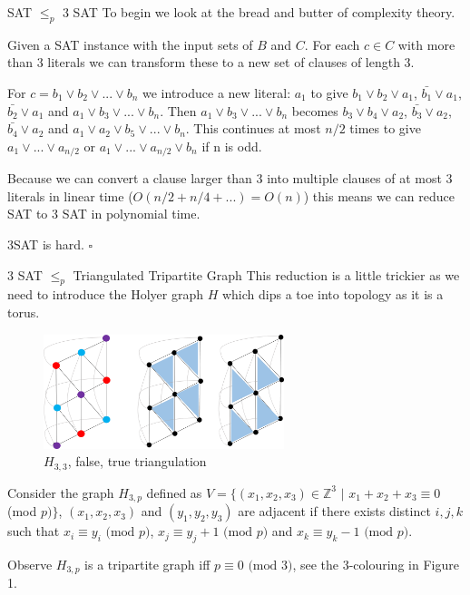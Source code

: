 \documentclass[final]{beamer}
\newlength{\colwidth}
\newcounter{col}
\begin{document}
\begin{frame}[t]
\begin{columns}[t]
\begin{column}{\colwidth}
\begin{block}{SAT $\leq_p$ 3 SAT}
To begin we look at the bread and butter of complexity theory.

Given a SAT instance with the input sets of $B$ and $C$. For each $c \in C$ with more than 3 literals we can transform these to a new set of clauses of length 3. 

For $c = b_1 \lor b_2 \lor ... \lor b_n$ we introduce a new literal: $a_1$ to give $b_1 \lor b_2 \lor a_1$, $\bar{b_1} \lor a_1$, $\bar{b_2} \lor a_1$ and $a_1 \lor b_3 \lor ... \lor b_n$. Then $a_1 \lor b_3 \lor ... \lor b_n$ becomes $b_3 \lor b_4 \lor a_2$, $\bar{b_3} \lor a_2$, $\bar{b_4} \lor a_2$ and $a_1 \lor a_2 \lor b_5 \lor ... \lor b_n$. This continues at most $n/2$ times to give $a_1 \lor ... \lor a_{n/2}$ or $a_1 \lor ... \lor a_{n/2} \lor b_n$ if n is odd. 

Because we can convert a clause larger than 3 into multiple clauses of at most 3 literals in linear time ($O(n/2 + n/4 + ...) = O(n)$) this means we can reduce SAT to 3 SAT in polynomial time. 

3SAT is hard. $\square$

  \end{block}
  \begin{block}{3 SAT $\leq_p$ Triangulated Tripartite Graph \cite{doi:10.1137/0210054}}
This reduction is a little trickier as we need to introduce the Holyer graph $H$ which dips a toe into topology as it is a torus.

\begin{figure}
		\vspace{-25pt}
		\includegraphics[width=70mm]{holyer_graph.png}
		\caption{$H_{3,3}$, false, true triangulation}
		\vspace{-15pt}
\end{figure}

Consider the graph $H_{3,p}$ defined as $V=\{(x_1,x_2,x_3)\in \mathbb{Z}^3$ $|$ $x_1+x_2+x_3\equiv 0$ (mod $p)\}$, $(x_1,x_2,x_3)$ and $(y_1,y_2,y_3)$ are adjacent if there exists distinct $i,j,k$ such that $x_i\equiv y_i \text{ (mod }p)$, $x_j\equiv y_j+1 \text{ (mod }p)$ and $x_k\equiv y_k-1 \text{ (mod }p)$.


Observe $H_{3,p}$ is a tripartite graph iff $p\equiv0 \text{ (mod }3)$, see the 3-colouring in Figure 1.




\end{block}
\end{column}
\end{columns}
\end{frame}
\end{document}
